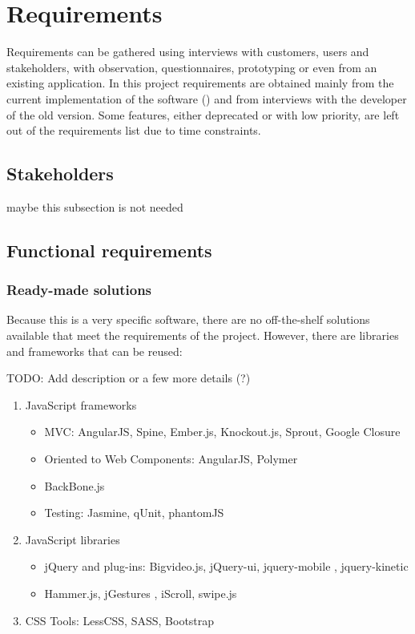 \chapter{Requirements}
Requirements can be gathered using interviews with customers, users and stakeholders, with observation, questionnaires, prototyping or even from an existing application.
In this project requirements are obtained mainly from the current implementation of the software () and from interviews with the developer of the old version.
Some features, either deprecated or with low priority, are left out of the requirements list due to time constraints. 

\section{Stakeholders}
maybe this subsection is not needed

\section{Functional requirements}

\subsection{Ready-made solutions}
Because this is a very specific software, there are no off-the-shelf solutions available that meet the requirements of the project.
However, there are libraries and frameworks that can be reused:

TODO: Add description or a few more details (?)

\begin{enumerate}
    \item JavaScript frameworks
    \begin{itemize}
        \item \ac{MVC}: AngularJS, Spine, Ember.js, Knockout.js, Sprout, Google Closure
        \item Oriented to Web Components: AngularJS, Polymer
        \item BackBone.js
    \item Testing: Jasmine, qUnit, phantomJS   
    \end{itemize}
    \item JavaScript libraries
    \begin{itemize}
        \item jQuery and plug-ins: Bigvideo.js, jQuery-ui, jquery-mobile , jquery-kinetic  
        \item Hammer.js, jGestures , iScroll, swipe.js
    \end{itemize} 
    \item \ac{CSS} Tools: LessCSS, SASS, Bootstrap
\end{enumerate}

